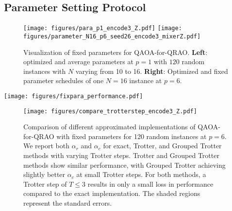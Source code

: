 \documentclass[conference,10pt]{IEEEtran}
\newcommand{\QAOAQRAO}{QAOA-for-QRAO}
\begin{document}
\subsection{Parameter Setting Protocol}\label{sec:set_parameter}
\begin{figure}[t]
    \centering
    \texttt{[image: figures/para\_p1\_encode3\_Z.pdf]}
    \texttt{[image: figures/parameter\_N16\_p6\_seed26\_encode3\_mixerZ.pdf]}
    \caption{Visualization of fixed parameters for \QAOAQRAO{}. 
    \textbf{Left}: optimized and average parameters at $p=1$ with $120$ random instances with $N$ varying from 10 to 16.
    \textbf{Right}: Optimized and fixed parameter schedules of one $N=16$ instance at $p=6$.
    } 
    \label{fig:fixpara_value}
\end{figure}
\begin{figure*}[t]
    \centering
    \texttt{[image: figures/fixpara\_performance.pdf]}
    \caption{Performance of \QAOAQRAO{} with fixed parameters. 
    \textbf{A} We present the ratio of the performance with fixed parameters to the performance with optimized parameters. The fixed parameters performance is comparable to the ones with optimized parameters across different values of $p$ in both $\alpha_r$ (blue line) and $\alpha_c$ (orange line).
    \textbf{B} We show the average approximation ratios $\alpha_r$ and $\alpha_c$ for 120 random instances, with $N$ varying from 10 to 16 and $p$ up to 6. The performance improves as $p$ increases, indicating that the fixed parameters are of high quality across different values of $p$.
    \textbf{C} We present the average approximation ratios $\alpha_r$ and $\alpha_c$ with a fixed $p=6$ and $N$ varying from 10 to 26. The performance with fixed parameters remains consistently good, even for larger problem sizes. 
    The shaded regions represent the standard errors.
    } 
    \label{fig:fixpara_performance}
\end{figure*}
\begin{figure}[t]
    \centering
    \texttt{[image: figures/compare\_trotterstep\_encode3\_Z.pdf]}
    \caption{Comparison of different approximated implementations of \QAOAQRAO{} with fixed parameters for 120 random instances at $p=6$. We report both $\alpha_r$ and $\alpha_c$ for exact, Trotter, and Grouped Trotter methods with varying Trotter steps. Trotter and Grouped Trotter methods show similar performance, with Grouped Trotter achieving slightly better $\alpha_c$ at small Trotter steps. For both methods, a Trotter step of $T \leq 3$ results in only a small loss in performance compared to the exact implementation. The shaded regions represent the standard errors.}
    \label{fig:compare_trotter}
\end{figure}
\end{document}
